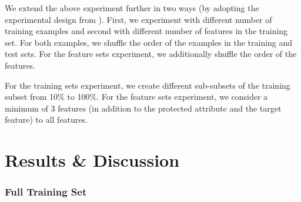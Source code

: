 \documentclass{article}
\begin{document}
We extend the above experiment further in two ways (by adopting the
experimental design from \cite{zhang2021ignorance}). First, we
experiment with different number of training examples and second with
different number of features in the training set. For both examples,
we shuffle the order of the examples in the training and test sets. For
the feature sets experiment, we additionally shuffle the order of the
features.

For the training sets experiment, we create different sub-subsets of
the training subset from 10\% to 100\%. For the feature sets
experiment, we consider a minimum of 3 features (in addition to the
protected attribute and the target feature) to all features.


\section{Results \& Discussion}\label{sec:results}








\subsubsection{Full Training Set}\label{sec:results-full-data}
\end{document}
